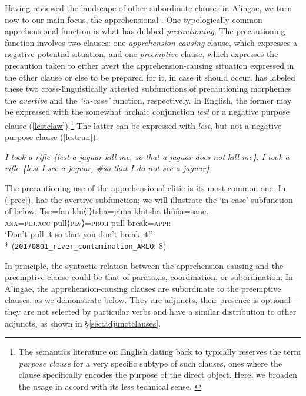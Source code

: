 \documentclass[output=paper,colorlinks,citecolor=brown]{langscibook}
\begin{document}
Having reviewed the landscape of other subordinate clauses in A'ingae, we turn now to our main focus, the apprehensional \sane. One typologically common apprehensional function is what \citet{lichtenberk1995apprehensional} has dubbed  \textit{precautioning}. The precautioning function involves two clauses: one \emph{apprehension-causing} clause, which expresses a negative potential situation, and one \emph{preemptive} clause, which expresses the precaution taken to either avert the apprehension-causing situation expressed in the other clause or else to be prepared for it, in case it should occur. \citet{lichtenberk1995apprehensional} has labeled these two cross-linguistically attested subfunctions of precautioning morphemes the \emph{avertive} and the \emph{`in-case'} function, respectively. In English, the former may be expressed with the somewhat archaic conjunction \emph{lest} or a negative purpose clause (\ref{lestclaw}).\footnote{The semantics literature on English dating back to \citet{faraci1974aspects} typically reserves the term \textit{purpose clause} for a very specific subtype of such clauses, ones where the clause specifically encodes the purpose of the direct object. Here, we broaden the usage in accord with its less technical sense. \label{fn:repeat}} The latter can be expressed with \emph{lest}, but not a negative purpose clause (\ref{lestrun}).
\begin{exe}
    \ex \label{lestclaw}
    \glt \textit{I took a rifle \textup{\{}lest a jaguar kill me, so that a jaguar does not kill me\textup{\}}}.
    \ex \label{lestrun}
    \glt \textit{I took a rifle \textup{\{}lest I see a jaguar, \#so that I do not see a jaguar\textup{\}}}.
\end{exe}

The precautioning use of the apprehensional clitic  is its most common one. In (\ref{prec}),  has the avertive subfunction; we will illustrate the `in-case' subfunction of  below.
    \ea \label{prec} %
    \gll Tse=fan         khi⟨'⟩tsha=jama   {\ob}khitsha thûña=sane.{\cb}  \\
         \textsc{ana=pej.acc} pull⟨\textsc{plv}⟩=\textsc{proh} pull         break\textsc{=appr}   \\
    \glt `Don't pull it so that you don't break it!' \\*
    \hfill (\texttt{20170801\_river\_contamination\_ARLQ}: {\textsc{8}})
    \z

In principle, the syntactic relation between the apprehension-causing and the preemptive clause could be that of parataxis, coordination, or subordination. In A'ingae, the apprehension-causing  clauses are subordinate to the preemptive clauses, as we demonstrate below. They are adjuncts, their presence is optional -- they are not selected by particular verbs and have a similar distribution to other adjuncts, as shown in \S\ref{sec:adjunctclauses}.
\end{document}
